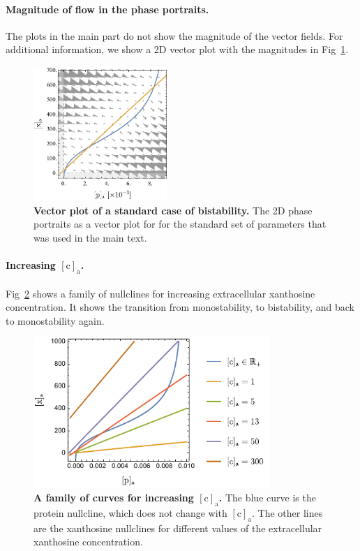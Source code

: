 \documentclass[10pt,letterpaper]{article}
\newcommand{\n}[1]{\mathrm{#1}}
\begin{document}
\paragraph*{Magnitude of flow in the phase portraits.}
The plots in the main part do not show the magnitude of the vector fields.
For additional information, we show a 2D vector plot with the magnitudes in
Fig~\ref{figS4:vector}.

\begin{figure}
	\centering
	\includegraphics[width=0.45\textwidth]{FigSI4.pdf}
	\caption{{\bf Vector plot of a standard case of bistability.}
		The 2D phase portraits as a vector plot for for the standard set of
		parameters that was used in the main text.}
	\label{figS4:vector} 
\end{figure}

\paragraph*{Increasing $\n{[c]_a}$.}
Fig~\ref{figS5:incC} shows a family of nullclines for increasing
extracellular xanthosine concentration. It shows the transition from
monostability, to bistability, and back to monostability again.

\begin{figure}
	\centering
	\includegraphics[width=0.8\textwidth]{FigSI5.pdf}
	\caption{{\bf A family of curves for increasing $\n{[c]_a}$.}
		The blue curve is the protein nullcline, which does not change with
		$\n{[c]_a}$. The other lines are the xanthosine nullclines for
		different values of the extracellular xanthosine concentration.}
	\label{figS5:incC}
\end{figure}
\end{document}
